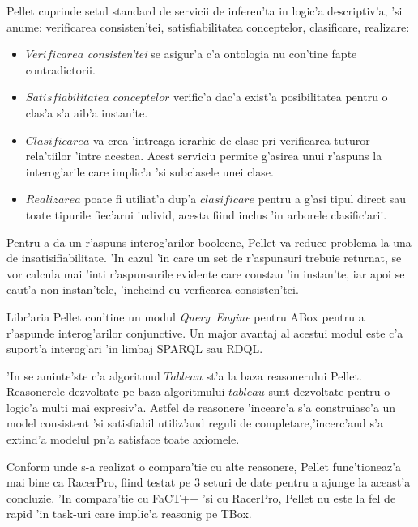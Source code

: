\documentclass[12pt,a4paper,twoside]{report}
\begin{document}
Pellet cuprinde setul standard de servicii de inferen'ta in logic'a descriptiv'a, 'si anume: verificarea consisten'tei, satisfiabilitatea conceptelor, clasificare, realizare:
\begin{itemize}
    \item $Verificarea$ {\it consisten'tei} se asigur'a c'a ontologia nu con'tine fapte contradictorii.
    \item $Satisfiabilitatea$ $conceptelor$ verific'a dac'a exist'a posibilitatea pentru o clas'a s'a aib'a instan'te.
    \item $Clasificarea$ va crea 'intreaga ierarhie de clase pri verificarea tuturor rela'tiilor 'intre acestea. Acest serviciu permite g'asirea unui r'aspuns la interog'arile care implic'a 'si subclasele unei clase.
    \item $Realizarea$ poate fi utiliat'a dup'a $clasificare$ pentru a g'asi tipul direct sau toate tipurile fiec'arui individ, acesta fiind inclus 'in arborele clasific'arii.
\end{itemize}
   

Pentru a da un r'aspuns interog'arilor booleene, Pellet va reduce problema la una de insatisifiabilitate. 'In cazul 'in care un set de r'aspunsuri trebuie returnat, se vor calcula mai 'int\ia i r'aspunsurile evidente care constau 'in instan'te, iar apoi se caut'a non-instan'tele, 'incheind cu verficarea consisten'tei. 

Libr'aria Pellet con'tine un modul {\it Query\ Engine} pentru ABox pentru a r'aspunde interog'arilor conjunctive. Un major avantaj al acestui modul este c'a suport'a interog'ari 'in limbaj SPARQL sau RDQL.


'In \cite{tableau_alg} se aminte'ste c'a algoritmul $Tableau$ st'a la baza reasonerului Pellet. Reasonerele dezvoltate pe baza algoritmului $tableau$ sunt dezvoltate pentru o logic'a multi mai expresiv'a. Astfel de reasonere 'incearc'a s'a construiasc'a un model consistent 'si satisfiabil utiliz'and reguli de completare,'incerc'and s'a extind'a modelul p\ia n'a satisface toate axiomele.

Conform \cite{SirinPellet:Reasoner} unde s-a realizat o compara'tie cu alte reasonere, Pellet func'tioneaz'a mai bine ca RacerPro, fiind testat pe 3 seturi de date pentru a ajunge la aceast'a concluzie. 'In compara'tie cu FaCT++ 'si cu RacerPro, Pellet nu este la fel de rapid 'in task-uri care implic'a reasonig pe TBox. 
\end{document}

